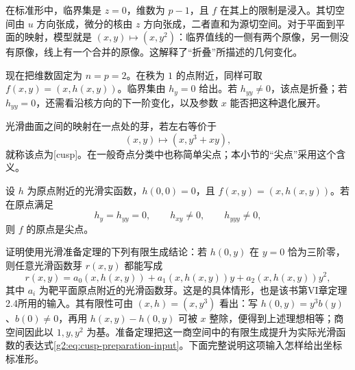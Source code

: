 \ProseParagraphBreak

在标准形中，临界集是 \(z=0\)，维数为 \(p-1\)，且 \(f\) 在其上的限制是浸入。其切空间由 \(u\) 方向张成，微分的核由 \(z\) 方向张成，二者直和为源切空间。对于平面到平面的映射，模型就是 \((x,y)\mapsto(x,y^2)\)：临界值线的一侧有两个原像，另一侧没有原像，线上有一个合并的原像。这解释了“折叠”所描述的几何变化。

\ProseParagraphBreak

现在把维数固定为 \(n=p=2\)。在秩为 \(1\) 的点附近，同样可取 \(f(x,y)=(x,h(x,y))\)。临界集由 \(h_y=0\) 给出。若 \(h_{yy}\ne0\)，该点是折叠；若 \(h_{yy}=0\)，还需看沿核方向的下一阶变化，以及参数 \(x\) 能否把这种退化展开。

\begin{definition}\label{g2:def:plane-cusp}
	光滑曲面之间的映射在一点处的芽，若左右等价于
	\begin{equation}\label{g2:eq:plane-cusp-normal-form}
		(x,y)\longmapsto(x,y^3+xy),
	\end{equation}
	就称该点为[cusp]。在一般奇点分类中也称简单尖点；本小节的“尖点”采用这个含义。
\end{definition}

\begin{theorem}\label{g2:thm:plane-cusp-recognition}
	设 \(h\) 为原点附近的光滑实函数，\(h(0,0)=0\)，且 \(f(x,y)=(x,h(x,y))\)。若在原点满足
	\begin{equation}\label{g2:eq:plane-cusp-criterion}
		h_y=h_{yy}=0,\qquad h_{xy}\ne0,\qquad h_{yyy}\ne0,
	\end{equation}
	则 \(f\) 的原点是尖点。
\end{theorem}

证明使用光滑准备定理的下列有限生成结论：若 \(h(0,y)\) 在 \(y=0\) 恰为三阶零，则任意光滑函数芽 \(r(x,y)\) 都能写成
\begin{equation}\label{g2:eq:cusp-preparation-input}
	r(x,y)=a_0(x,h(x,y))+a_1(x,h(x,y))y+a_2(x,h(x,y))y^2,
\end{equation}
其中 \(a_i\) 为靶平面原点附近的光滑函数芽。这是\cite[第IV章定理3.6、推论3.5及推论3.11]{GolubitskyGuillemin1973}的具体情形，也是该书第VI章定理2.4所用的输入。其有限性可由 \((x,h)=(x,y^3)\) 看出：写 \(h(0,y)=y^3b(y)\)、\(b(0)\ne0\)，再用 \(h(x,y)-h(0,y)\) 可被 \(x\) 整除，便得到上述理想相等；商空间因此以 \(1,y,y^2\) 为基。准备定理把这一商空间中的有限生成提升为实际光滑函数的表达式\eqref{g2:eq:cusp-preparation-input}。下面完整说明这项输入怎样给出坐标标准形。

